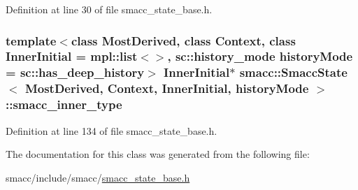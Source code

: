 Definition at line 30 of file smacc\+\_\+state\+\_\+base.\+h.

\subsubsection[{\texorpdfstring{smacc\+\_\+inner\+\_\+type}{smacc_inner_type}}]{\setlength{\rightskip}{0pt plus 5cm}template$<$class Most\+Derived, class Context, class Inner\+Initial = mpl\+::list$<$$>$, sc\+::history\+\_\+mode history\+Mode = sc\+::has\+\_\+deep\+\_\+history$>$ Inner\+Initial$\ast$ {\bf smacc\+::\+Smacc\+State}$<$ Most\+Derived, Context, Inner\+Initial, history\+Mode $>$\+::smacc\+\_\+inner\+\_\+type}\hypertarget{classsmacc_1_1SmaccState_a087d0f66729b98614feb8c59ea548af1}{}\label{classsmacc_1_1SmaccState_a087d0f66729b98614feb8c59ea548af1}


Definition at line 134 of file smacc\+\_\+state\+\_\+base.\+h.



The documentation for this class was generated from the following file\+:\begin{DoxyCompactItemize}
\item 
smacc/include/smacc/\hyperlink{smacc__state__base_8h}{smacc\+\_\+state\+\_\+base.\+h}\end{DoxyCompactItemize}
